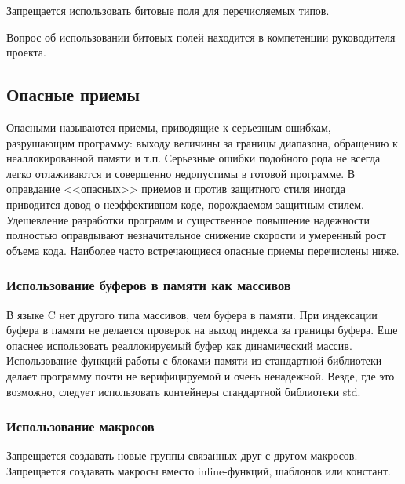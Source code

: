 {{{Запрещается использовать битовые поля для перечисляемых типов. 

Вопрос об использовании битовых полей находится в компетенции руководителя проекта.

\newpage
\subsection{Опасные приемы}

Опасными называются приемы, приводящие к серьезным ошибкам, разрушающим программу: выходу величины за границы диапазона, обращению к неаллокированной памяти и т.п. Серьезные ошибки подобного рода не всегда легко отлаживаются и совершенно недопустимы в готовой программе. В оправдание <<опасных>> приемов и против защитного стиля иногда приводится довод о неэффективном коде, порождаемом защитным стилем. Удешевление разработки программ и существенное повышение надежности полностью оправдывают незначительное снижение скорости и умеренный рост объема кода. Наиболее часто встречающиеся опасные приемы перечислены ниже.

\subsubsection{Использование буферов в памяти как массивов}

В языке C нет другого типа массивов, чем буфера в памяти. При индексации буфера в памяти не делается проверок на выход индекса за границы буфера. Еще опаснее использовать реаллокируемый буфер как динамический массив. Использование функций работы с блоками памяти из стандартной библиотеки делает программу почти не верифицируемой и очень ненадежной. Везде, где это возможно, следует использовать контейнеры стандартной библиотеки std.

\subsubsection{Использование макросов}

Запрещается создавать новые группы связанных друг с другом макросов. Запрещается создавать макросы вместо inline-функций, шаблонов или констант.

}}}
